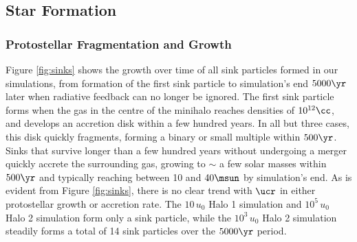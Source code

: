 \subsection{Star Formation}
\subsubsection{Protostellar Fragmentation and Growth}
\label{subsec:sink_formation}

Figure \ref{fig:sinks} shows the growth over time of all sink particles formed in our simulations, from formation of the first sink particle to simulation's end $5000\yr$ later when radiative feedback can no longer be ignored. 
The first sink particle forms when the gas in the centre of the minihalo reaches densities of $10^{12}\cc$, and develops an accretion disk within a few hundred years. 
In all but three cases, this disk quickly fragments, forming a binary or small multiple within $500\yr$. 
Sinks that survive longer than a few hundred years without undergoing a merger quickly accrete the surrounding gas, growing to $\sim$ a few solar masses within $500\yr$ and typically reaching between 10 and $40\msun$ by simulation's end.
As is evident from Figure \ref{fig:sinks}, there is no clear trend with $\ucr$ in either protostellar growth or accretion rate.
The $10\,u_0$ Halo 1 simulation and $10^5\,u_0$ Halo 2 simulation form only a sink particle, while the $10^3\,u_0$ Halo 2 simulation steadily forms a total of 14 sink particles over the $5000\yr$ period.





